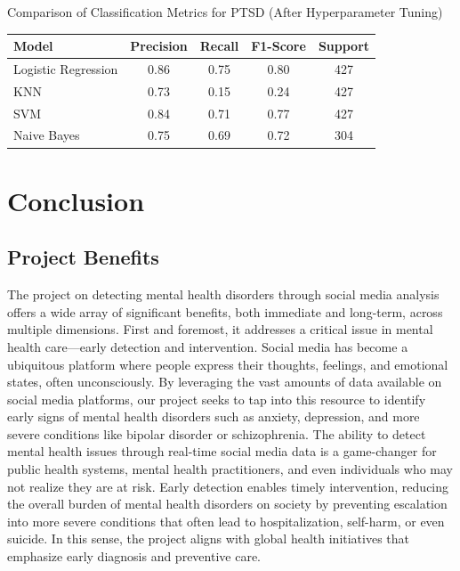 \begin{center}
\vspace{0.25in}

\caption{Comparison of Classification Metrics for PTSD (After Hyperparameter Tuning)}
\begin{tabular}{|l|c|c|c|c|}
\hline
\textbf{Model} & \textbf{Precision} & \textbf{Recall} & \textbf{F1-Score} & \textbf{Support} \\ \hline
Logistic Regression & 0.86 & 0.75 & 0.80 & 427 \\ \hline
KNN                & 0.73 & 0.15 & 0.24 & 427 \\ \hline
SVM                & 0.84 & 0.71 & 0.77 & 427 \\ \hline
Naive Bayes        & 0.75 & 0.69 & 0.72 & 304 \\ \hline
\end{tabular}

\end{center}






\section{Conclusion}

\subsection{Project Benefits}
\noindent
The project on detecting mental health disorders through social media analysis offers a wide array of significant benefits, both immediate and long-term, across multiple dimensions. First and foremost, it addresses a critical issue in mental health care—early detection and intervention. Social media has become a ubiquitous platform where people express their thoughts, feelings, and emotional states, often unconsciously. By leveraging the vast amounts of data available on social media platforms, our project seeks to tap into this resource to identify early signs of mental health disorders such as anxiety, depression, and more severe conditions like bipolar disorder or schizophrenia. The ability to detect mental health issues through real-time social media data is a game-changer for public health systems, mental health practitioners, and even individuals who may not realize they are at risk. Early detection enables timely intervention, reducing the overall burden of mental health disorders on society by preventing escalation into more severe conditions that often lead to hospitalization, self-harm, or even suicide. In this sense, the project aligns with global health initiatives that emphasize early diagnosis and preventive care. \\

